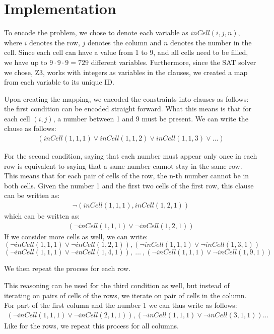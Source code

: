 \documentclass[12pt,a4paper]{article}
\begin{document}
\section*{Implementation}
To encode the problem, we chose to denote each variable as $inCell(i,j,n)$, where $i$ denotes the row, $j$ denotes the column and $n$ denotes the number in the cell.
Since each cell can have a value from 1 to 9, and all cells need to be filled, we have up to $9\cdot9\cdot9 = 729$ different variables.
Furthermore, since the SAT solver we chose, Z3, works with integers as variables in the clauses, we created a map from each variable to its unique ID.

Upon creating the mapping, we encoded the constraints into clauses as follows: the first condition can be encoded straight forward. What this means is that for each cell $(i,j)$, a number between 1 and 9 must be present. We can write the clause as follows:
\begin{align*}
  (inCell(1,1,1) \vee inCell(1,1,2) \vee inCell(1,1,3) \vee ...)
\end{align*}

For the second condition, saying that each number must appear only once in each row is equivalent to saying that a same number cannot stay in the same row. This means that for each pair of cells of the row, the n-th number cannot be in both cells. Given the number 1 and the first two cells of the first row, this clause can be written as:
\begin{align*}
  \neg (inCell(1,1,1) , inCell(1,2,1))
\end{align*}
which can be written as:
\begin{align*}
  (\neg inCell(1,1,1) \vee \neg inCell(1,2,1))
\end{align*}
If we consider more cells as well, we can write:
\[(\neg inCell(1,1,1) \vee \neg inCell(1,2,1)), (\neg inCell(1,1,1) \vee \neg inCell(1,3,1)) \]
\[   (\neg inCell(1,1,1) \vee \neg inCell(1,4,1)),\ \dots \ , (\neg inCell(1,1,1) \vee \neg inCell(1,9,1))\]

We then repeat the process for each row.
\medskip

This reasoning can be used for the third condition as well, but instead of iterating on pairs of cells of the rows, we iterate on pair of cells in the column. For part of the first column and the number 1 we can thus write as follows:
\begin{align*}
  (\neg inCell(1,1,1) \vee \neg inCell(2,1,1)) , (\neg inCell(1,1,1) \vee \neg inCell(3,1,1)) ...
\end{align*}
Like for the rows, we repeat this process for all columns.
\medskip
\end{document}
